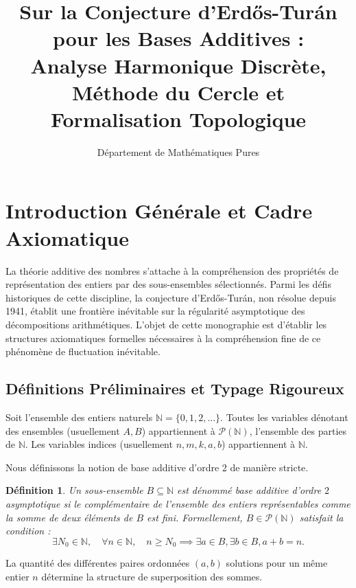 \documentclass[12pt,a4paper]{article}
\title{Sur la Conjecture d'Erd\H{o}s-Tur\'an pour les Bases Additives :\\ Analyse Harmonique Discr\`ete, M\'ethode du Cercle et Formalisation Topologique}
\author{D\'epartement de Math\'ematiques Pures}
\date{}
\newtheorem{definition}[theorem]{D\'efinition}
\begin{document}
\maketitle
\tableofcontents

\section{Introduction G\'en\'erale et Cadre Axiomatique}

La th\'eorie additive des nombres s'attache \`a la compr\'ehension des propri\'et\'es de repr\'esentation des entiers par des sous-ensembles s\'electionn\'es. Parmi les d\'efis historiques de cette discipline, la conjecture d'Erd\H{o}s-Tur\'an, non r\'esolue depuis 1941, \'etablit une fronti\`ere in\'evitable sur la r\'egularit\'e asymptotique des d\'ecompositions arithm\'etiques. L'objet de cette monographie est d'\'etablir les structures axiomatiques formelles n\'ecessaires \`a la compr\'ehension fine de ce ph\'enom\`ene de fluctuation in\'evitable.

\subsection{D\'efinitions Pr\'eliminaires et Typage Rigoureux}

Soit l'ensemble des entiers naturels $\mathbb{N} = \{0, 1, 2, \dots\}$. Toutes les variables d\'enotant des ensembles (usuellement $A, B$) appartiennent \`a $\mathcal{P}(\mathbb{N})$, l'ensemble des parties de $\mathbb{N}$. Les variables indices (usuellement $n, m, k, a, b$) appartiennent \`a $\mathbb{N}$.

Nous d\'efinissons la notion de base additive d'ordre 2 de mani\`ere stricte.

\begin{definition}
Un sous-ensemble $B \subseteq \mathbb{N}$ est d\'enomm\'e \textit{base additive d'ordre $2$ asymptotique} si le compl\'ementaire de l'ensemble des entiers repr\'esentables comme la somme de deux \'el\'ements de $B$ est fini. Formellement, $B \in \mathcal{P}(\mathbb{N})$ satisfait la condition :
\begin{equation}
\exists N_0 \in \mathbb{N}, \quad \forall n \in \mathbb{N}, \quad n \ge N_0 \implies \exists a \in B, \exists b \in B, a + b = n.
\end{equation}
\end{definition}

La quantit\'e des diff\'erentes paires ordonn\'ees $(a, b)$ solutions pour un m\^eme entier $n$ d\'etermine la structure de superposition des sommes.
\end{document}
